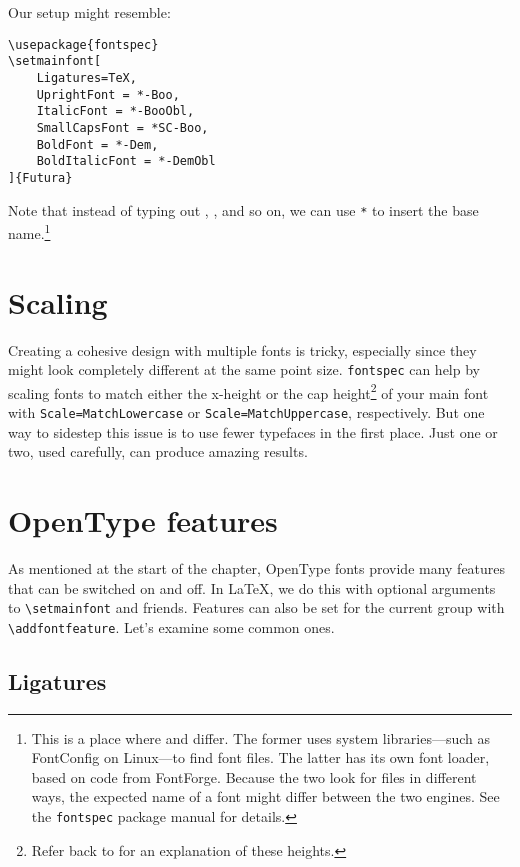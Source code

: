 \noindent Our setup might resemble:
\begin{leftfigure}
\begin{lstlisting}
\usepackage{fontspec}
\setmainfont[
    Ligatures=TeX,
    UprightFont = *-Boo,
    ItalicFont = *-BooObl,
    SmallCapsFont = *SC-Boo,
    BoldFont = *-Dem,
    BoldItalicFont = *-DemObl
]{Futura}
\end{lstlisting}
\end{leftfigure}
Note that instead of typing out ,
, and so on, we can use \texttt{*} to insert the base
name.\punckern\footnote{This is
a place where \XeLaTeX{} and \LuaLaTeX{} differ.
The former uses system libraries---such as FontConfig on Linux---to
find font files.
The latter has its own font loader,
based on code from FontForge.\punckern{}
Because the two look for files in different ways,
the expected name of a font might differ between the two engines.
See the \texttt{fontspec} package manual for details.}

\section{Scaling}

Creating a cohesive design with multiple fonts is tricky,
especially since they might look completely different
at the same point size.
\texttt{fontspec} can help by scaling fonts to match either the
x-height or the cap height\footnote{Refer back to 
for an explanation of these heights.} of your main font with
\verb|Scale=MatchLowercase| or \verb|Scale=MatchUppercase|,
respectively.
But one way to sidestep this issue is to use fewer
typefaces in the first place.
Just one or two, used carefully, can produce amazing results.


\section{OpenType features}

As mentioned at the start of the chapter,
OpenType fonts provide many features that can be switched on and off.
In \LaTeX{}, we do this with optional arguments to
\verb|\setmainfont| and friends.
Features can also be set for the current group with
\verb|\addfontfeature|.
Let's examine some common ones.

\subsection{Ligatures}

